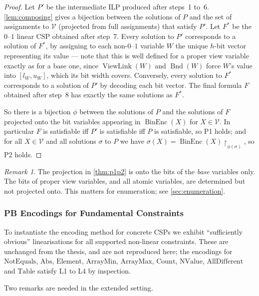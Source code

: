 \documentclass[11pt,a4paper]{article}
\theoremstyle{plain}
\theoremstyle{definition}
\theoremstyle{remark}
\newtheorem*{remark}{Remark}
\newcommand{\fname}[1]{\ensuremath{\operatorname{#1}}}
\newcommand{\globalcon}[1]{\ensuremath{\mathrm{#1}}}
\newcommand{\BinEnc}{\fname{BinEnc}}
\newcommand{\Bnd}{\fname{Bnd}}
\newcommand{\ViewLink}{\fname{ViewLink}}
\begin{document}
\begin{proof}
Let $P'$ be the intermediate ILP produced after steps~1 to~6.
\cref{lem:composing} gives a bijection between the solutions of $P$ and the set
of assignments to $\mathcal V$ (projected from full assignments) that satisfy
$P'$.  Let $F^*$ be the $0$--$1$ linear CSP obtained after step~7.  Every
solution to $P'$ corresponds to a solution of $F^*$, by assigning to each
non-$0$--$1$ variable $W$ the unique $h$-bit vector representing its value ---
note that this is well defined for a proper view variable exactly as for a
base one, since $\ViewLink(W)$ and $\Bnd(W)$ force $W$'s value into $[l_W,u_W]$,
which its bit width covers.  Conversely, every solution to $F^*$ corresponds to
a solution of $P'$ by decoding each bit vector.  The final formula $F$ obtained
after step~8 has exactly the same solutions as $F^*$.

So there is a bijection $\phi$ between the solutions of $P$ and the solutions of
$F$ projected onto the bit variables appearing in $\BinEnc(X)$ for
$X\in\mathcal V$.  In particular $F$ is satisfiable iff $P'$ is satisfiable iff
$P$ is satisfiable, so P1 holds; and for all $X\in\mathcal V$ and all solutions
$\sigma$ to $P$ we have $\sigma(X)=\BinEnc(X)\!\restriction_{\phi(\sigma)}$, so
P2 holds.
\end{proof}

\begin{remark}
The projection in \cref{thm:p1p2} is onto the bits of the \emph{base} variables
only.  The bits of proper view variables, and all atomic variables, are
determined but not projected onto.  This matters for enumeration; see
\cref{sec:enumeration}.
\end{remark}

\subsubsection{PB Encodings for Fundamental Constraints}

To instantiate the encoding method for concrete CSPs we exhibit ``sufficiently
obvious'' linearisations for all supported non-linear constraints.  These are
unchanged from the thesis, and are not reproduced here; the encodings for
$\globalcon{NotEquals}$, $\globalcon{Abs}$, $\globalcon{Element}$,
$\globalcon{ArrayMin}$, $\globalcon{ArrayMax}$, $\globalcon{Count}$,
$\globalcon{NValue}$, $\globalcon{AllDifferent}$ and $\globalcon{Table}$
satisfy L1 to L4 by inspection.

Two remarks are needed in the extended setting.
\end{document}
